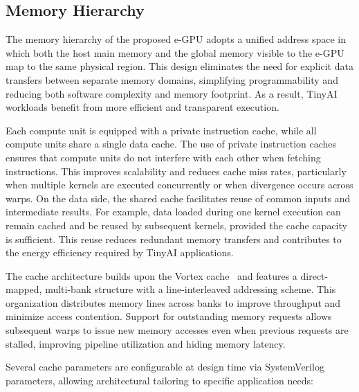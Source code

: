         \subsection{Memory Hierarchy}
        
            The memory hierarchy of the proposed \mbox{e-GPU} adopts a unified address space in which both the host main memory and the global memory visible to the \mbox{e-GPU} map to the same physical region. This design eliminates the need for explicit data transfers between separate memory domains, simplifying programmability and reducing both software complexity and memory footprint. As a result, TinyAI workloads benefit from more efficient and transparent execution.
            
            Each compute unit is equipped with a private instruction cache, while all compute units share a single data cache. The use of private instruction caches ensures that compute units do not interfere with each other when fetching instructions. This improves scalability and reduces cache miss rates, particularly when multiple kernels are executed concurrently or when divergence occurs across warps. On the data side, the shared cache facilitates reuse of common inputs and intermediate results. For example, data loaded during one kernel execution can remain cached and be reused by subsequent kernels, provided the cache capacity is sufficient. This reuse reduces redundant memory transfers and contributes to the energy efficiency required by TinyAI applications.
            
            The cache architecture builds upon the Vortex cache~\cite{vortex} and features a direct-mapped, multi-bank structure with a line-interleaved addressing scheme. This organization distributes memory lines across banks to improve throughput and minimize access contention. Support for outstanding memory requests allows subsequent warps to issue new memory accesses even when previous requests are stalled, improving pipeline utilization and hiding memory latency.
 
            Several cache parameters are configurable at design time via SystemVerilog parameters, allowing architectural tailoring to specific application needs:
            
